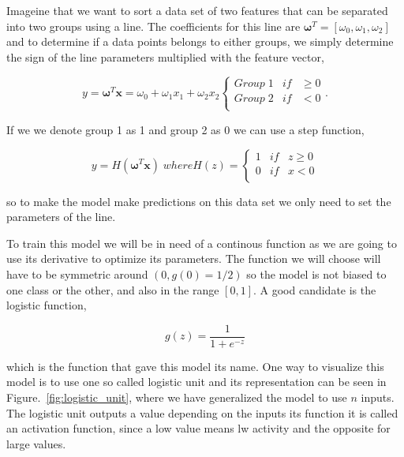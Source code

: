 Imageine that we want to sort a data set of two features that can be separated into two groups using a line. The coefficients for this line are $\bm{\omega}^{T}=[\omega_0,\omega_1, \omega_2]$ and to determine if a data points belongs to either groups, we simply determine the sign of the line parameters multiplied with the feature vector,

\begin{equation}
    y=\bm{\omega}^T\bm{x}=\omega_0+\omega_1 x_1 + \omega_2 x_2 \left\{
    \begin{array}{ccc}
        Group\;1 & if & \geq 0 \\
        Group\;2 & if & < 0 \\
    \end{array}
    \right. .
\end{equation}

If we we denote group 1 as 1 and group 2 as 0 we can use a step function,

\begin{equation}
    y = H(\bm{\omega}^T\bm{x}) \; where H(z) =
    \left\{
        \begin{array}{ccc}
            1 & if & z \geq 0 \\
            0 & if & x < 0 \\
        \end{array}
    \right.
\end{equation}

so to make the model make predictions on this data set we only need to set the parameters of the line.


To train this model we will be in need of a continous function as we are going to use its derivative to optimize its parameters. The function we will choose will have to be symmetric around $(0,g(0)=1/2)$ so the model is not biased to one class or the other, and also in the range $[0,1]$. A good candidate is the logistic function,

\begin{equation}
    g(z) = \frac{1}{1+e^{-z}}
\end{equation}

which is the function that gave this model its name. One way to visualize this model is to use one so called logistic unit and its representation can be seen in Figure.~\ref{fig:logistic_unit}, where we have generalized the model to use $n$ inputs. The logistic unit outputs a value depending on the inputs its function it is called an activation function, since a low value means lw activity and the opposite for large values.

